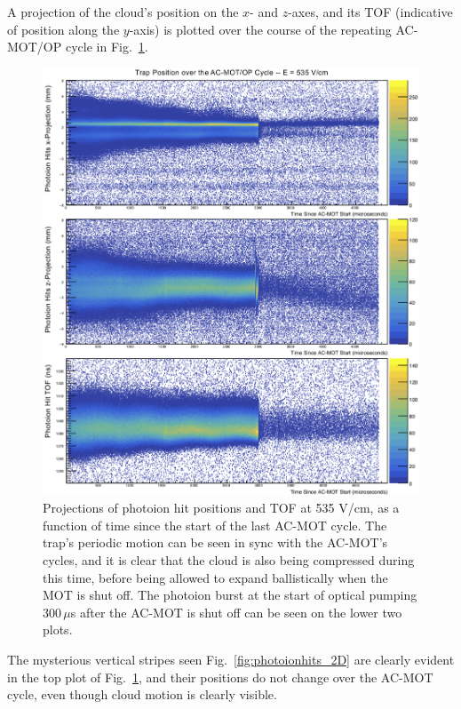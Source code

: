 A projection of the cloud's position on the $x$- and $z$-axes, and its \ac{TOF} (indicative of position along the $y$-axis) is plotted over the course of the repeating \ac{AC-MOT}/\ac{OP} cycle in Fig.~\ref{fig:position_v_acmottime_3axes}. 
%
\begin{figure}[h!t!b!!!!!]
	\centering
	\includegraphics[width=.99\linewidth]
	{Figures/rMCP_xyz_vs_acmottime.png}
	\caption[Photoion Hit Positions at 535 V/cm, as a function of AC-MOT Time]{Projections of photoion hit positions and \ac{TOF} at 535 V/cm, as a function of time since the start of the last \ac{AC-MOT} cycle.  The trap's periodic motion can be seen in sync with the \ac{AC-MOT}'s cycles, and it is clear that the cloud is also being compressed during this time, before being allowed to expand ballistically when the MOT is shut off.  The photoion burst at the start of optical pumping 300$\,\mu$s after the AC-MOT is shut off can be seen on the lower two plots. 	}	
	\label{fig:position_v_acmottime_3axes}
\end{figure}
\FloatBarrier
%

\noindent
The mysterious vertical stripes seen Fig.~\ref{fig:photoionhits_2D} are clearly evident in the top plot of
Fig.~\ref{fig:position_v_acmottime_3axes}, and their positions do not change over the AC-MOT cycle, even though cloud motion is clearly visible.  
 
